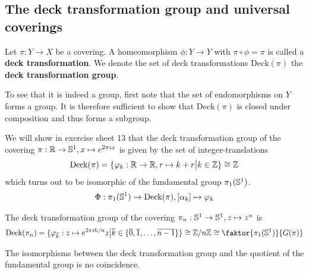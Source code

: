 \subsection{The deck transformation group and universal coverings}

\begin{dfn}[]
Let $\pi:Y \to X$ be a covering.
A homeomorphism $\phi: Y \to  Y$ with $\pi \circ \phi = \pi$ is called a \textbf{deck transformation}.
We denote the set of deck transformations $\text{Deck}(\pi)$ the \textbf{deck transformation group}.
\end{dfn}
To see that it is indeed a group, first note that the set of endomorphisms on $Y$ forms a group. 
It is therefore sufficient to show that $\text{Deck}(\pi)$ is closed under composition and thus forms a subgroup. 

\begin{ex}[]

We will show in exercise sheet 13 that the deck transformation group of the covering $\pi: \mathbb{R} \to \mathbb{S}^{1}, x \mapsto  e^{2 \pi i x}$ is given by the set of integer-translations
\begin{align*}
  \text{Deck}(\pi) = \{\varphi_k : \mathbb{R} \to  \mathbb{R}, r \mapsto  k + r \big\vert k \in \mathbb{Z}\} \cong \mathbb{Z}
\end{align*}
which turns out to be isomorphic of the fundamental group $\pi_1(\mathbb{S}^{1})$.
\begin{align*}
  \Phi: \pi_1(\mathbb{S}^{1}) \to  \text{Deck}(\pi), [\alpha_k] \mapsto \varphi_k
\end{align*}
\end{ex}

\begin{ex}[]
The deck transformation group of the covering $\pi_n : \mathbb{S}^{1} \to \mathbb{S}^{1}, z \mapsto  z^{n}$ is
\begin{align*}
  \text{Deck}(\pi_n) = \{\phi_{\overline{k}}: z \mapsto  e^{2 \pi i k/n}z \big\vert \overline{k} \in \{\overline{0},\overline{1},\ldots,\overline{n-1}\}\}\iso \Z/n\Z \iso \faktor{\pi_1(\IS^{1})}{G(\pi)}
\end{align*}
\end{ex}

The isomorphisms between the deck transformation group and the quotient of the fundamental group is no coincidence.


